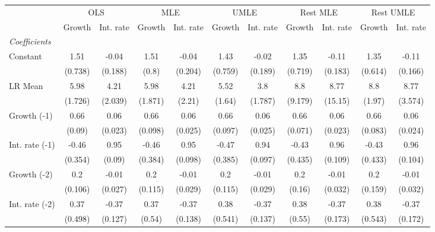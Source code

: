 \begin{table}[htbp] 
	\centering
	\begin{tabular}{@{\extracolsep{4pt}}lcccccccccc@{}}		\hline\hline
		 		 & \multicolumn{2}{c}{OLS} &\multicolumn{2}{c}{MLE} &\multicolumn{2}{c}{UMLE} &\multicolumn{2}{c}{Rest MLE} &\multicolumn{2}{c}{Rest UMLE} \\ 
 		 & Growth 	 & Int. rate 	 & Growth 	 & Int. rate 	 & Growth 	 & Int. rate 	 & Growth 	 & Int. rate 	 & Growth 	 & Int. rate\\\cline{2-3}\cline{4-5}\cline{6-7}\cline{8-9}\cline{10-11}
\rule{0pt}{4ex} 
 \emph{Coefficients} 	  		 & 		 & 		 & 		 & 		 & 		 & 		 & 		 & 		 & 		 &\\ 
\quad Constant 	 & 1.51 	 & -0.04 	 & 1.51 	 & -0.04 	 & 1.43 	 & -0.02 	 & 1.35 	 & -0.11 	 & 1.35 	 & -0.11	 \\ 
 		 & (0.738) 	 & (0.188) 	 & (0.8) 	 & (0.204) 	 & (0.759) 	 & (0.189) 	 & (0.719) 	 & (0.183) 	 & (0.614) 	 & (0.166) 	 \\ 
\quad LR Mean 	 & 5.98 	 & 4.21 	 & 5.98 	 & 4.21 	 & 5.52 	 & 3.8 	 & 8.8 	 & 8.77 	 & 8.8 	 & 8.77	 \\ 
 		 & (1.726) 	 & (2.039) 	 & (1.871) 	 & (2.21) 	 & (1.64) 	 & (1.787) 	 & (9.179) 	 & (15.15) 	 & (1.97) 	 & (3.574) 	 \\ 
\quad Growth (-1) 	 &0.66 	 & 0.06 	 & 0.66 	 & 0.06 	 & 0.66 	 & 0.06 	 & 0.66 	 & 0.06 	 & 0.66 	 & 0.06	 \\ 
 		 & (0.09) 	 & (0.023) 	 & (0.098) 	 & (0.025) 	 & (0.097) 	 & (0.025) 	 & (0.071) 	 & (0.023) 	 & (0.083) 	 & (0.024) 	 \\ 
\quad Int. rate (-1) 	 &-0.46 	 & 0.95 	 & -0.46 	 & 0.95 	 & -0.47 	 & 0.94 	 & -0.43 	 & 0.96 	 & -0.43 	 & 0.96	 \\ 
 		 & (0.354) 	 & (0.09) 	 & (0.384) 	 & (0.098) 	 & (0.385) 	 & (0.097) 	 & (0.435) 	 & (0.109) 	 & (0.433) 	 & (0.104) 	 \\ 
\quad Growth (-2) 	 &0.2 	 & -0.01 	 & 0.2 	 & -0.01 	 & 0.2 	 & -0.01 	 & 0.2 	 & -0.01 	 & 0.2 	 & -0.01	 \\ 
 		 & (0.106) 	 & (0.027) 	 & (0.115) 	 & (0.029) 	 & (0.115) 	 & (0.029) 	 & (0.16) 	 & (0.032) 	 & (0.159) 	 & (0.032) 	 \\ 
\quad Int. rate (-2) 	 &0.37 	 & -0.37 	 & 0.37 	 & -0.37 	 & 0.38 	 & -0.37 	 & 0.38 	 & -0.37 	 & 0.38 	 & -0.37	 \\ 
 		 & (0.498) 	 & (0.127) 	 & (0.54) 	 & (0.138) 	 & (0.541) 	 & (0.137) 	 & (0.55) 	 & (0.173) 	 & (0.543) 	 & (0.172) 	 \\ 

\end{tabular}
\end{table}
